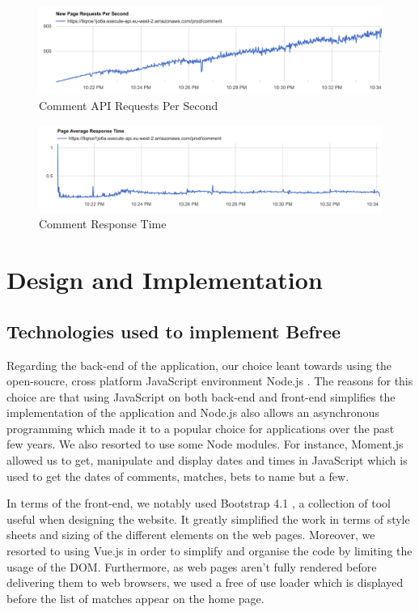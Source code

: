 \documentclass[conference]{IEEEtran}
\begin{document}
\begin{figure}[htbp]
\centerline{\includegraphics[scale=0.26]{comment-qps.png}}
\caption{Comment API Requests Per Second}
\end{figure}

\begin{figure}[htbp]
\centerline{\includegraphics[scale=0.26]{comment-response-time.png}}
\caption{Comment Response Time}
\end{figure}


\section{Design and Implementation}
\subsection{Technologies used to implement Befree}
Regarding the back-end of the application, our choice leant towards using the open-soucre, cross platform JavaScript environment Node.js \cite{node}. The reasons for this choice are that using JavaScript on both back-end and front-end simplifies the implementation of the application and Node.js also allows an asynchronous programming which made it to a popular choice for applications over the past few years. We also resorted to use some Node modules. For instance, Moment.js \cite{moment} allowed us to get, manipulate and display dates and times in JavaScript which is used to get the dates of comments, matches, bets to name but a few.

In terms of the front-end, we notably used Bootstrap 4.1 \cite{bootstrap}, a collection of tool useful when designing the website. It greatly simplified the work in terms of style sheets and sizing of the different elements on the web pages. Moreover, we resorted to using Vue.js \cite{vue} in order to simplify and organise the code by limiting the usage of the DOM. Furthermore, as web pages aren't fully rendered before delivering them to web browsers, we used a free of use loader \cite{loader} which is displayed before the list of matches appear on the home page.  
\end{document}
